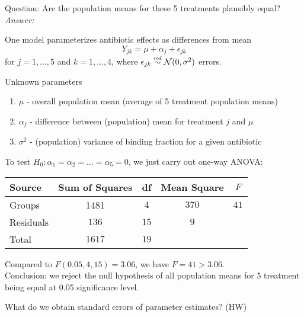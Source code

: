 Question:  Are the population means for these 5 treatments plausibly equal?\\
	{\it Answer:}\\
\begin{pf}
	One model parameterizes antibiotic effects as differences from mean
	$$
	Y_{jk} = \mu + \alpha_j + \epsilon_{jk}
	$$
	for $j = 1, \dots, 5$ and $k = 1, \dots, 4$, where $\epsilon_{jk} \overset{iid}{\sim} \mathcal{N}(0, \sigma^2)$ errors.
	\begin{center}
		Unknown parameters
		\begin{enumerate}
			\item $\mu$ - overall population mean (average of 5 treatment population means)
			\item $\alpha_j$ - difference between (population) mean for treatment $j$ and $\mu$
			\item $\sigma^2$ - (population) variance of binding fraction for a given antibiotic
		\end{enumerate}
	\end{center}
	
	To test $H_0: \alpha_1 = \alpha_2 = \dots = \alpha_5 = 0$, we just carry out one-way ANOVA:
	\begin{table}[H]
		\renewcommand{\arraystretch}{1.5}
		\centering
		\begin{tabular}{lcccc}
			\toprule
			Source & Sum of Squares & df & Mean Square & $F$\\
			\hline
			Groups & 1481 & $4$ & $370$ & $41$ \\
			Residuals & $136$ & $15$ & $9$ & \\
			\hline
			Total & $1617$ & $19$ & &\\
			\bottomrule
		\end{tabular}
	\end{table}
	Compared to $F(0.05, 4, 15) = 3.06$, we have $F = 41 > 3.06$.\\
	Conclusion: we reject the null hypothesis of all population means for 5 treatment being equal at 0.05 significance level.
\end{pf}

What do we obtain standard errors of parameter estimates? (HW)



























